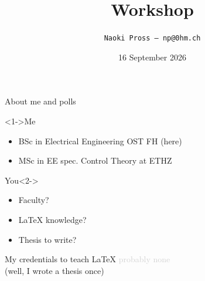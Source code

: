\documentclass[xetex, onlymath]{beamer}
\title{\textrm{\LaTeXe} Workshop}
\author[NaoPross]{\texttt{Naoki Pross --- np@0hm.ch}}
\date{16 September 2026}
\institute[OST]{OST FHO Campus Rapperswil}
\begin{document}
\frame{
  \maketitle
}

\begin{frame}[fragile]{About me and polls}
  \begin{block}<1->{Me}
    \begin{itemize}
      \item BSc in Electrical Engineering OST FH (here)
      \item MSc in EE spec. Control Theory at ETHZ
    \end{itemize}
  \end{block}
  \begin{exampleblock}{You}<2->
    \begin{itemize}
      \item Faculty?
      \item \textrm{\LaTeX} knowledge?
      \item Thesis to write?
    \end{itemize}
  \end{exampleblock}
\end{frame}

\begin{frame}{My credentials to teach \textrm{\LaTeX}}
  \centering
  \textcolor{lightgray}{\footnotesize probably none} \\
  \textcolor{lightgray!50}{\footnotesize (well, I wrote a thesis once)}
\end{frame}
\end{document}
